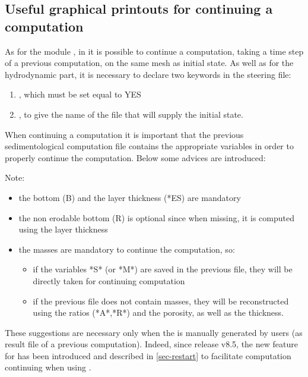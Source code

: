 \subsection{Useful graphical printouts for continuing a computation}
As for the module , in \gaia{} it is possible to continue a computation, taking a time step of a previous computation, on the same mesh as initial state.
As well as for the hydrodynamic part, it is necessary to declare two keywords in the steering file:
\begin{enumerate}
\item {}, which must be set equal to YES
\item {}, to give the name of the file that will supply the initial state.
\end{enumerate}
When continuing a computation it is important that the previous sedimentological computation file contains the appropriate variables in order to properly continue the computation. Below some advices are introduced:

\begin{WarningBlock}{Note:}
\begin{itemize}
\item the bottom (B) and the layer thickness (*ES) are mandatory
\item the non erodable bottom (R) is optional since when missing, it is computed using the layer thickness
\item the masses are mandatory to continue the computation, so:
\begin{itemize}
 \item if the variables *S* (or *M*) are saved in the previous file, they will be directly taken for continuing computation
 \item if the previous file does not contain masses, they will be reconstructed using the ratios (*A*,*R*) and the porosity, as well as the thickness.
\end{itemize}
\end{itemize}
\end{WarningBlock}

These suggestions are necessary only when the
 is manually generated by
users (as result file of a previous computation).
Indeed, since release v8.5, the new feature  for \gaia{}
has been introduced and described in \ref{sec-restart} to facilitate computation
continuing when using \gaia{}.

%

